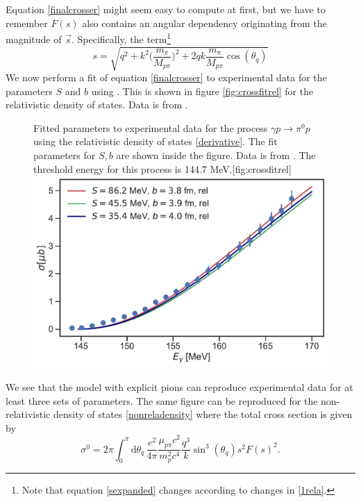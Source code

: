 Equation \eqref{finalcrosser} might seem easy to compute at first, but we have to remember $F(s)$ also contains an angular dependency originating from the magnitude of $\vec{s}$. Specifically, the term\footnote{Note that equation \eqref{sexpanded} changes according to changes in \eqref{1rela}.}
\begin{equation} \label{sexpanded}
	s = \sqrt{q^2+k^2\bigg(\frac{m_\pi}{M_{p\pi}}\bigg)^2+2qk\frac{m_\pi}{M_{p\pi}}\cos(\theta_q)}
\end{equation}
We now perform a fit of equation \eqref{finalcrosser} to experimental data for the parameters $S$ and $b$ using \cite{Scipy,LMfit}. This is shown in figure \ref{fig:crossfitrel} for the relativistic density of states. Data is from  \cite{Schmidt_2001}.
\begin{figure}[H]
	\begin{sidecaption}{Fitted parameters to experimental data for the process $\gamma p \rightarrow \pi^0 p$ using the relativistic density of states \eqref{derivative}. The fit parameters for $S,b$ are shown inside the figure. Data is from \cite{Schmidt_2001}. The threshold energy for this process is 144.7 MeV.}[fig:crossfitrel]
		\includegraphics[width=\linewidth]{Figures/crossfit_rel.pdf}
	\end{sidecaption}
\end{figure}
We see that the model with explicit pions can reproduce experimental data for at least three sets of parameters. The same figure can be reproduced for the non-relativistic density of states \eqref{nonreladensity} where the total cross section is given by
\begin{equation} \label{nonrelcrossfit}
	\sigma^0 = 2\pi \int_0^\pi \text{d}\theta_q \, \frac{e^2}{4\pi}\frac{\mu_{p\pi}c^2}{m_p^2 c^4}\frac{q^3}{k}\sin^3(\theta_q)s^2 F(s)^2.
\end{equation} 

